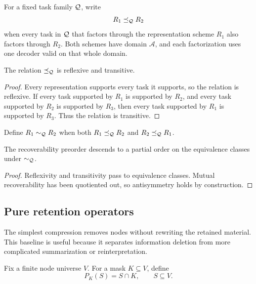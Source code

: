 \begin{PPTdefinition}
\label{PPT:res:7:4}
For a fixed task family $\mathcal Q$, write
\[
R_1\preceq_{\mathcal Q} R_2
\]
when every task in $\mathcal Q$ that factors through the representation scheme $R_1$ also factors through $R_2$. Both schemes have domain $\mathscr A$, and each factorization uses one decoder valid on that whole domain.
\end{PPTdefinition}

\begin{PPTproposition}
\label{PPT:res:7:5}
The relation $\preceq_{\mathcal Q}$ is reflexive and transitive.
\end{PPTproposition}

\begin{proof}
Every representation supports every task it supports, so the relation is reflexive. If every task supported by $R_1$ is supported by $R_2$, and every task supported by $R_2$ is supported by $R_3$, then every task supported by $R_1$ is supported by $R_3$. Thus the relation is transitive.
\end{proof}

Define $R_1\sim_{\mathcal Q}R_2$ when both $R_1\preceq_{\mathcal Q}R_2$ and $R_2\preceq_{\mathcal Q}R_1$.

\begin{PPTcorollary}
\label{PPT:res:7:6}
The recoverability preorder descends to a partial order on the equivalence classes under $\sim_{\mathcal Q}$.
\end{PPTcorollary}

\begin{proof}
Reflexivity and transitivity pass to equivalence classes. Mutual recoverability has been quotiented out, so antisymmetry holds by construction.
\end{proof}


\subsection{Pure retention operators}

The simplest compression removes nodes without rewriting the retained material. This baseline is useful because it separates information deletion from more complicated summarization or reinterpretation.

\begin{PPTdefinition}
\label{PPT:res:7:7}
Fix a finite node universe $V$. For a mask $K\subseteq V$, define
\[
P_K(S)=S\cap K,
\qquad S\subseteq V.
\]
\end{PPTdefinition}

